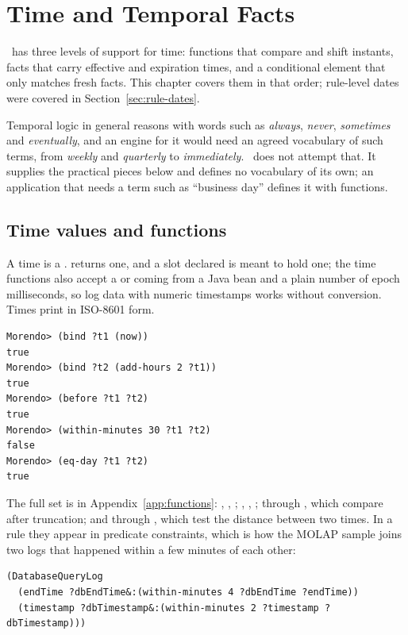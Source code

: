 \chapter{Time and Temporal Facts}
\label{ch:temporal}

\Morendo\ has three levels of support for time: functions that compare
and shift instants, facts that carry effective and expiration times, and
a conditional element that only matches fresh facts. This chapter covers
them in that order; rule-level dates were covered in
Section~\ref{sec:rule-dates}.

Temporal logic in general reasons with words such as \emph{always},
\emph{never}, \emph{sometimes} and \emph{eventually}, and an engine for
it would need an agreed vocabulary of such terms, from \emph{weekly} and
\emph{quarterly} to \emph{immediately}. \Morendo\ does not attempt that.
It supplies the practical pieces below and defines no vocabulary of its
own; an application that needs a term such as ``business day'' defines
it with functions.

\section{Time values and functions}

A time is a .  returns one, and a slot
declared  is meant to hold one; the time functions also
accept a  or  coming from a Java bean and
a plain number of epoch milliseconds, so log data with numeric
timestamps works without conversion. Times print in ISO-8601 form.

\begin{lstlisting}[style=shell]
Morendo> (bind ?t1 (now))
true
Morendo> (bind ?t2 (add-hours 2 ?t1))
true
Morendo> (before ?t1 ?t2)
true
Morendo> (within-minutes 30 ?t1 ?t2)
false
Morendo> (eq-day ?t1 ?t2)
true
\end{lstlisting}

The full set is in Appendix~\ref{app:functions}: ,
, ; , ,
;  through , which compare after
truncation; and  through , which
test the distance between two times. In a rule they appear in predicate
constraints, which is how the MOLAP sample joins two logs that happened
within a few minutes of each other:

\begin{lstlisting}
(DatabaseQueryLog
  (endTime ?dbEndTime&:(within-minutes 4 ?dbEndTime ?endTime))
  (timestamp ?dbTimestamp&:(within-minutes 2 ?timestamp ?dbTimestamp)))
\end{lstlisting}

